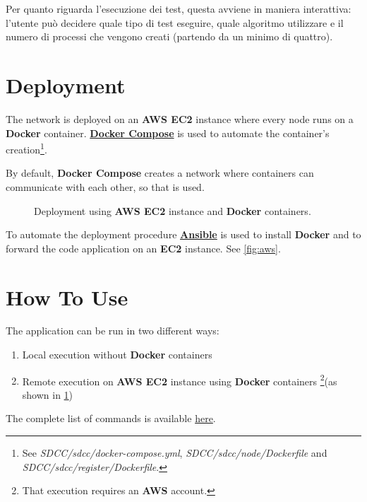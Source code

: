 \documentclass[conference]{IEEEtran}
\begin{document}
Per quanto riguarda l'esecuzione dei test, questa avviene in maniera interattiva: l'utente può decidere quale tipo di test eseguire, quale algoritmo utilizzare e il numero di processi che vengono creati (partendo da un minimo di quattro).

\section{Deployment}

The network is deployed on an \textbf{AWS EC2} instance where every node runs on a \textbf{Docker} container. 
\href{https://docs.docker.com/compose/}{\textbf{Docker Compose}} is used to automate the container's creation\footnote{See \textit{SDCC/sdcc/docker-compose.yml},  \textit{SDCC/sdcc/node/Dockerfile} and \textit{SDCC/sdcc/register/Dockerfile}.}. 

By default, \textbf{Docker Compose} creates a network where containers can communicate with each other, so that is used. 

\begin{figure}[htbp]\label{fig:arch}
  \centering
  
  \caption{Deployment using \textbf{AWS EC2} instance and \textbf{Docker} containers.}
\end{figure}

To automate the deployment procedure \href{https://www.ansible.com/}{\textbf{Ansible}} is used to install \textbf{Docker} and to forward the code application on an \textbf{EC2} instance. See \ref{fig:aws}.

\section{How To Use}\label{how}

The application can be run in two different ways:

\begin{enumerate}
    \item Local execution without \textbf{Docker} containers
    \item Remote execution on \textbf{AWS EC2} instance using \textbf{Docker} containers \footnote{That execution requires an \textbf{AWS} account.}(as shown in \ref{fig:arch})
\end{enumerate}

The complete list of commands is available \href{https://github.com/matt-merman/SDCC#running}{here}.
\end{document}
